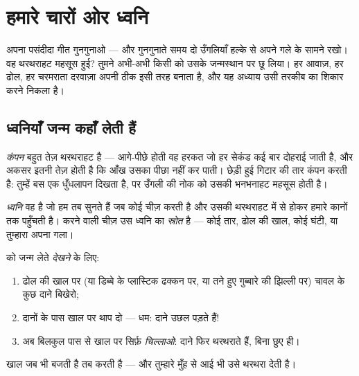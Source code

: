 \chapter{हमारे चारों ओर ध्वनि}\label{ch:g3:sound-around-us}

अपना पसंदीदा गीत गुनगुनाओ --- और गुनगुनाते समय दो उँगलियाँ हल्के से
अपने गले के सामने रखो। वह थरथराहट महसूस हुई? तुमने अभी-अभी किसी 
को उसके जन्मस्थान पर छू लिया। हर आवाज़, हर ढोल, हर चरमराता दरवाज़ा
अपनी  ठीक इसी तरह बनाता है, और यह अध्याय उसी तरकीब का शिकार करने
निकला है।

\section{ध्वनियाँ जन्म कहाँ लेती हैं}

\begin{definition}[कंपन]\label{def:g3:sound-around-us:vibration}
\emph{कंपन} बहुत तेज़ थरथराहट है --- आगे-पीछे होती वह
हरकत जो हर सेकंड कई बार दोहराई जाती है, और अकसर इतनी तेज़ होती है कि
आँख उसका पीछा नहीं कर पाती। छेड़ी हुई गिटार की तार कंपन करती है:
तुम्हें बस एक धुँधलापन दिखता है, पर उँगली की नोक को उसकी भनभनाहट
महसूस होती है।
\end{definition}

\begin{definition}[ध्वनि]\label{def:g3:sound-around-us:sound}
\emph{ध्वनि} वह है जो हम तब सुनते हैं जब कोई चीज़ 
करती है और उसकी थरथराहट  में से होकर हमारे कानों तक पहुँचती है।
 करने वाली चीज़ उस ध्वनि का \emph{स्रोत} है --- कोई तार, ढोल की
खाल, कोई घंटी, या तुम्हारा अपना गला।
\end{definition}

\begin{method}[चावल को नचाना]\label{met:g3:sound-around-us:rice}
 को जन्म लेते \emph{देखने} के लिए:
\begin{enumerate}
  \item ढोल की खाल पर (या डिब्बे के प्लास्टिक ढक्कन पर, या तने हुए
        गुब्बारे की झिल्ली पर) चावल के कुछ दाने बिखेरो;
  \item दानों के पास खाल पर थाप दो --- धम: दाने उछल पड़ते हैं!
  \item अब बिलकुल पास से खाल पर सिर्फ़ \emph{चिल्लाओ}: दाने फिर
        थरथराते हैं, बिना छुए ही।
\end{enumerate}
खाल जब भी बजती है तब  करती है --- और तुम्हारे मुँह से आई  भी
उसे थरथरा देती है।
\end{method}

